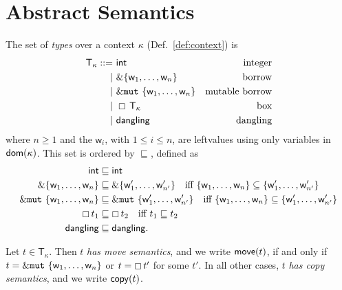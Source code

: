 \section{Abstract Semantics}\label{sec:abstract_semantics}

\begin{definition}[Types]
  The set of \emph{types} over a context $\kappa$ (Def.~\ref{def:context}) is
  \begin{align*}
    \mathsf{T}_\kappa ::=&\ \mathsf{int} & \text{integer}\\
    | &\ \&\{\mathsf{w}_1,\ldots,\mathsf{w}_n\} & \text{borrow}\\
    | &\ \&\mathtt{mut}\ \{\mathsf{w}_1,\ldots,\mathsf{w}_n\} & \text{mutable borrow}\\
    | &\ \boxempty\,{\mathsf{T}_\kappa} & \text{box}\\
    | &\ \mathsf{dangling} & \text{dangling}
  \end{align*}
  where $n\ge 1$ and the $\mathsf{w}_i$, with $1\le i\le n$, are leftvalues
  using only variables in $\mathsf{dom}(\kappa)$. This set is ordered by $\sqsubseteq$, defined as
  \begin{align*}
    \mathsf{int}&\sqsubseteq\mathsf{int}\\
    \&\{\mathsf{w}_1,\ldots,\mathsf{w}_n\} & \sqsubseteq
    \&\{\mathsf{w}'_1,\ldots,\mathsf{w}'_{n'}\} \quad\text{iff $\{\mathsf{w}_1,\ldots,\mathsf{w}_n\}\subseteq\{\mathsf{w}'_1,\ldots,\mathsf{w}'_{n'}\}$}\\
    \&\mathtt{mut}\ \{\mathsf{w}_1,\ldots,\mathsf{w}_n\} & \sqsubseteq
    \&\mathtt{mut}\ \{\mathsf{w}'_1,\ldots,\mathsf{w}'_{n'}\} \quad\text{iff $\{\mathsf{w}_1,\ldots,\mathsf{w}_n\}\subseteq\{\mathsf{w}'_1,\ldots,\mathsf{w}'_{n'}\}$}\\
    \boxempty\,{t_1}&\sqsubseteq\boxempty\,{t_2} \quad\text{iff $t_1\sqsubseteq t_2$}\\
    \mathsf{dangling}&\sqsubseteq\mathsf{dangling.}
  \end{align*}
\end{definition}

\begin{definition}\label{def:copy_move}
  Let $t\in\mathsf{T}_\kappa$. Then $t$ \emph{has move semantics}, and we write
  $\mathsf{move}(t)$, if and only if $t=\&\mathtt{mut}\ \{\mathsf{w}_1,\ldots,\mathsf{w}_n\}$ or
  $t=\boxempty\,{t'}$ for some $t'$. In all other cases, $t$ \emph{has copy semantics},
  and we write $\mathsf{copy}(t)$.
\end{definition}

